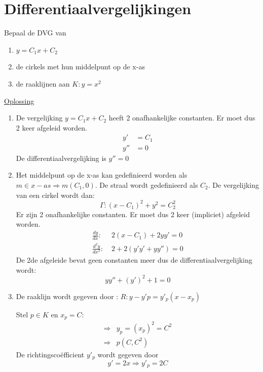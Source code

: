 \documentclass[12pt]{report}
\newcommand{\exercise}[2]{
#1


\underline{Oplossing}

#2

\hrulefill
}
\begin{document}
\chapter{Differentiaalvergelijkingen}
\exercise{Bepaal de DVG van \begin{enumerate}
                        \item $y = C_1x + C_2$
                        \item de cirkels met hun middelpunt op de x-as 
                        \item de raaklijnen aan $K: y = x^2$
                        \end{enumerate}}
{
\begin{enumerate}
\item De vergelijking $y = C_1x + C_2$ heeft 2 onafhankelijke constanten. Er moet dus 2 keer afgeleid worden.
\begin{equation*}
\begin{split}
y' & = C_1 \\
y'' & = 0
\end{split}
\end{equation*}
De differentiaalvergelijking is $y'' = 0$
\item Het middelpunt op de x-as kan gedefinieerd worden als $m \in x-as \Rightarrow m(C_1, 0)$. De straal wordt gedefinieerd als $C_2$. De vergelijking van een cirkel wordt dan:
$$\Gamma: (x - C_1)^2 + y^2 = C_2^2$$
Er zijn 2 onafhankelijke constanten. Er moet dus 2 keer (impliciet) afgeleid worden.
\begin{equation*}
\begin{split}
\frac{dy}{dx} :\; & 2(x - C_1) + 2yy' = 0 \\
\frac{d^2y}{dx^2} :\; & 2 + 2(y'y' + yy'') = 0
\end{split}
\end{equation*}
De 2de afgeleide bevat geen constanten meer dus de differentiaalvergelijking wordt: 
$$yy'' + (y')^2 + 1 = 0$$
\item De raaklijn wordt gegeven door : $R: y - y'p = y'_p(x - x_p)$

Stel $p \in K$ en $x_p = C$:
\begin{equation*}
\begin{split}
\Rightarrow & y_p = (x_p)^2 = C^2 \\
\Rightarrow & p(C, C^2)
\end{split}
\end{equation*}
De richtingscoëfficient $y'_p$ wordt gegeven door 
$$y'= 2x \Rightarrow y'_p = 2C$$


\end{enumerate}}
\end{document}
